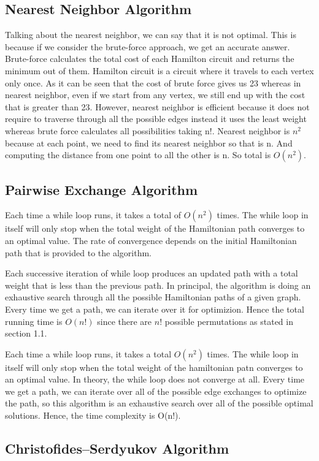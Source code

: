 \documentclass[12pt]{report}
\begin{document}
\subsection{Nearest Neighbor Algorithm }
Talking about the nearest neighbor, we can say that it is not optimal. This is because if we consider the brute-force approach, we get an accurate answer. Brute-force calculates the total cost of each Hamilton circuit and returns the minimum out of them. Hamilton circuit is a circuit where it travels to each vertex only once. As it can be seen that the cost of brute force gives us 23 whereas in nearest neighbor, even if we start from any vertex, we still end up with the cost that is greater than 23. However, nearest neighbor is efficient because it does not require to traverse through all the possible edges instead it uses the least weight whereas brute force calculates all possibilities taking n!. Nearest neighbor is $n^2$ because at each point, we need to find its nearest neighbor so that is n. And computing the distance from one point to all the other is n. So total is $O(n^2)$.

  \subsection{Pairwise Exchange Algorithm}
Each time a while loop runs, it takes a total of $O(n^2)$ times. The while loop in itself will only stop when the total weight of the Hamiltonian path converges to an optimal value. The rate of convergence depends on the initial Hamiltonian path that is provided to the algorithm.

Each successive iteration of while loop produces an updated path with a total weight that is less than the previous path. In principal, the algorithm is doing an exhaustive search through all the possible Hamiltonian paths of a given graph. Every time we get a path, we can iterate over it for optimizion. Hence the total running time is $O(n!)$ since there are $n!$ possible permutations as stated in section 1.1.

Each time a while loop runs, it takes a total $O(n^2)$ times. The while loop in itself will only stop when the total weight of the hamiltonian patn converges to an optimal value. In theory, the while loop does not converge at all. Every time we get a path, we can iterate over all of the possible edge exchanges to optimize the path, so this algorithm is an exhaustive search over all of the possible optimal solutions. Hence, the time complexity is O(n!).
\subsection{Christofides–Serdyukov Algorithm}
\end{document}
